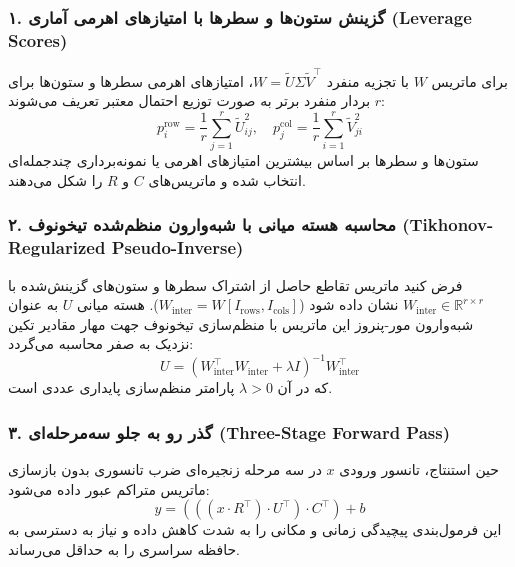 \subsubsection*{۱. گزینش ستون‌ها و سطرها با امتیازهای اهرمی آماری (Leverage Scores)}
برای ماتریس $W$ با تجزیه منفرد $W = \widetilde{U} \Sigma \widetilde{V}^\top$، امتیازهای اهرمی سطرها و ستون‌ها برای $r$ بردار منفرد برتر به صورت توزیع احتمال معتبر تعریف می‌شوند:
\begin{equation}
p_i^{\text{row}} = \frac{1}{r} \sum_{j=1}^r \widetilde{U}_{ij}^2, \quad p_j^{\text{col}} = \frac{1}{r} \sum_{i=1}^r \widetilde{V}_{ji}^2
\end{equation}
ستون‌ها و سطرها بر اساس بیشترین امتیازهای اهرمی یا نمونه‌برداری چندجمله‌ای انتخاب شده و ماتریس‌های $C$ و $R$ را شکل می‌دهند.

\subsubsection*{۲. محاسبه هسته میانی با شبه‌وارون منظم‌شده تیخونوف (Tikhonov-Regularized Pseudo-Inverse)}
فرض کنید ماتریس تقاطع حاصل از اشتراک سطرها و ستون‌های گزینش‌شده با $W_{\text{inter}} \in \mathbb{R}^{r \times r}$ نشان داده شود ($W_{\text{inter}} = W[I_{\text{rows}}, I_{\text{cols}}]$). هسته میانی $U$ به عنوان شبه‌وارون مور-پنروز این ماتریس با منظم‌سازی تیخونوف جهت مهار مقادیر تکین نزدیک به صفر محاسبه می‌گردد:
\begin{equation}
U = (W_{\text{inter}}^\top W_{\text{inter}} + \lambda I)^{-1} W_{\text{inter}}^\top
\end{equation}
که در آن $\lambda > 0$ پارامتر منظم‌سازی پایداری عددی است.

\subsubsection*{۳. گذر رو به جلو سه‌مرحله‌ای (Three-Stage Forward Pass)}
حین استنتاج، تانسور ورودی $x$ در سه مرحله زنجیره‌ای ضرب تانسوری بدون بازسازی ماتریس متراکم عبور داده می‌شود:
\begin{equation}
y = \left( \left( (x \cdot R^\top) \cdot U^\top \right) \cdot C^\top \right) + b
\end{equation}
این فرمول‌بندی پیچیدگی زمانی و مکانی را به شدت کاهش داده و نیاز به دسترسی به حافظه سراسری را به حداقل می‌رساند.

